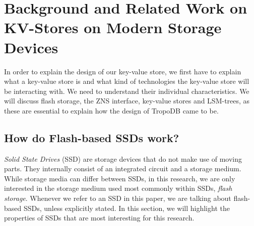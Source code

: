 \chapter{Background and Related Work on KV-Stores on Modern Storage \mbox{Devices}}
\label{sec:background}
In order to explain the design of our key-value store, we first have to explain what a key-value store is and what kind of technologies the key-value store will be interacting with. We need to understand their individual characteristics. We will discuss flash storage, the ZNS interface, key-value stores and LSM-trees, as these are essential to explain how the design of TropoDB came to be.

\section{How do Flash-based SSDs work?}
\textit{Solid State Drives} (SSD) are storage devices that do not make use of moving parts. They internally consist of an integrated circuit and a storage medium. While storage media can differ between SSDs, in this research, we are only interested in the storage medium used most commonly within SSDs, \textit{flash storage}. Whenever we refer to an SSD in this paper, we are talking about flash-based SSDs, unless explicitly stated. In this section, we will highlight the properties of SSDs that are most interesting for this research.

